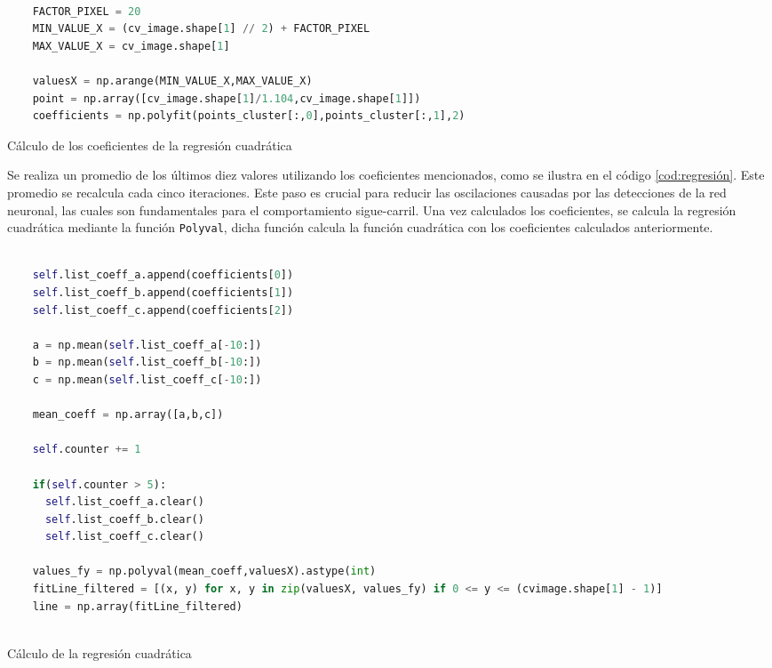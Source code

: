 \begin{code}[H]
  \begin{lstlisting}[language=Python]
  
    FACTOR_PIXEL = 20
    MIN_VALUE_X = (cv_image.shape[1] // 2) + FACTOR_PIXEL
    MAX_VALUE_X = cv_image.shape[1]
  
    valuesX = np.arange(MIN_VALUE_X,MAX_VALUE_X) 
    point = np.array([cv_image.shape[1]/1.104,cv_image.shape[1]])
    coefficients = np.polyfit(points_cluster[:,0],points_cluster[:,1],2)
  \end{lstlisting}
  \caption[Calculo de los coeficientes]{Cálculo de los coeficientes de la regresión cuadrática}
  \label{cod:Calculocoeficientes}
  \vspace{-1.5em}
  \end{code}  
Se realiza un promedio de los últimos diez valores utilizando los coeficientes mencionados, como se ilustra en el código \ref{cod:regresión}. Este promedio se recalcula 
cada cinco iteraciones. Este paso es crucial para reducir las oscilaciones causadas por las detecciones de la red neuronal, las cuales son fundamentales para el comportamiento sigue-carril. Una vez calculados los 
coeficientes, se calcula la regresión cuadrática mediante la función \texttt{Polyval}, dicha función calcula
la función cuadrática con los coeficientes calculados anteriormente. 

\begin{code}[H]
  \begin{lstlisting}[language=Python]

    self.list_coeff_a.append(coefficients[0])
    self.list_coeff_b.append(coefficients[1])
    self.list_coeff_c.append(coefficients[2])

    a = np.mean(self.list_coeff_a[-10:])
    b = np.mean(self.list_coeff_b[-10:])
    c = np.mean(self.list_coeff_c[-10:])

    mean_coeff = np.array([a,b,c])

    self.counter += 1

    if(self.counter > 5):
      self.list_coeff_a.clear()
      self.list_coeff_b.clear()
      self.list_coeff_c.clear()  

    values_fy = np.polyval(mean_coeff,valuesX).astype(int)
    fitLine_filtered = [(x, y) for x, y in zip(valuesX, values_fy) if 0 <= y <= (cvimage.shape[1] - 1)]
    line = np.array(fitLine_filtered)
   

  \end{lstlisting}
  \caption[Cálculo de la regresión cuadrática]{Cálculo de la regresión cuadrática}
  \label{cod:regresión}
  \end{code} 

